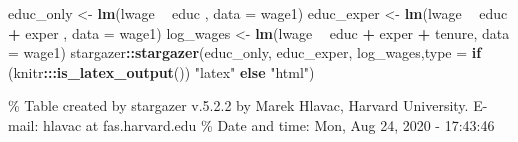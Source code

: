 \documentclass[]{book}
\newenvironment{Shaded}{\begin{snugshade}}{\end{snugshade}}
\newcommand{\ControlFlowTok}[1]{\textcolor[rgb]{0.13,0.29,0.53}{\textbf{#1}}}
\newcommand{\DataTypeTok}[1]{\textcolor[rgb]{0.13,0.29,0.53}{#1}}
\newcommand{\KeywordTok}[1]{\textcolor[rgb]{0.13,0.29,0.53}{\textbf{#1}}}
\newcommand{\NormalTok}[1]{#1}
\newcommand{\OperatorTok}[1]{\textcolor[rgb]{0.81,0.36,0.00}{\textbf{#1}}}
\newcommand{\StringTok}[1]{\textcolor[rgb]{0.31,0.60,0.02}{#1}}
\begin{document}
\begin{Shaded}
\begin{Highlighting}[]
\NormalTok{educ_only <-}\StringTok{ }\KeywordTok{lm}\NormalTok{(lwage }\OperatorTok{~}\StringTok{ }\NormalTok{educ                 , }\DataTypeTok{data =}\NormalTok{ wage1)}
\NormalTok{educ_exper <-}\StringTok{ }\KeywordTok{lm}\NormalTok{(lwage }\OperatorTok{~}\StringTok{ }\NormalTok{educ }\OperatorTok{+}\StringTok{ }\NormalTok{exper        , }\DataTypeTok{data =}\NormalTok{ wage1)}
\NormalTok{log_wages <-}\StringTok{ }\KeywordTok{lm}\NormalTok{(lwage }\OperatorTok{~}\StringTok{ }\NormalTok{educ }\OperatorTok{+}\StringTok{ }\NormalTok{exper }\OperatorTok{+}\StringTok{ }\NormalTok{tenure, }\DataTypeTok{data =}\NormalTok{ wage1)}
\NormalTok{stargazer}\OperatorTok{::}\KeywordTok{stargazer}\NormalTok{(educ_only, educ_exper, log_wages,}\DataTypeTok{type =} \ControlFlowTok{if}\NormalTok{ (knitr}\OperatorTok{:::}\KeywordTok{is_latex_output}\NormalTok{()) }\StringTok{"latex"} \ControlFlowTok{else} \StringTok{"html"}\NormalTok{)}
\end{Highlighting}
\end{Shaded}

\% Table created by stargazer v.5.2.2 by Marek Hlavac, Harvard University. E-mail: hlavac at fas.harvard.edu
\% Date and time: Mon, Aug 24, 2020 - 17:43:46
\end{document}

